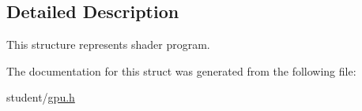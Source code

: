 \subsection{Detailed Description}
This structure represents shader program. 

The documentation for this struct was generated from the following file\+:\begin{DoxyCompactItemize}
\item 
student/\hyperlink{gpu_8h}{gpu.\+h}\end{DoxyCompactItemize}
